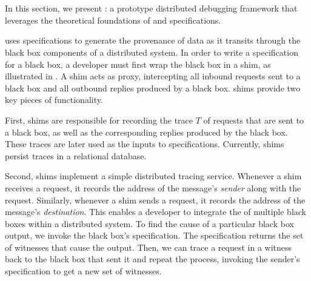\section{\fluent{}}
In this section, we present \fluent{}: a prototype distributed debugging
framework that leverages the theoretical foundations of \watprovenance{} and
\watprovenance{} specifications.
%

{}

\fluent{} uses \watprovenance{} specifications to generate the provenance of
data as it transits through the black box components of a distributed system.
In order to write a \watprovenance{} specification for a black box, a developer
must first wrap the black box in a \fluent{} shim, as illustrated in
. A shim acts as proxy, intercepting all inbound requests
sent to a black box and all outbound replies produced by a black box. \fluent{}
shims provide two key pieces of functionality.

First, \fluent{} shims are responsible for recording the trace $T$ of requests
that are sent to a black box, as well as the corresponding replies produced by
the black box. These traces are later used as the inputs to \watprovenance{}
specifications.  Currently, \fluent{} shims persist traces in a relational
database.

Second, \fluent{} shims implement a simple distributed tracing service.
Whenever a \fluent{} shim receives a request, it records the address of the
message's \emph{sender} along with the request. Similarly, whenever a \fluent{}
shim sends a request, it records the address of the message's
\emph{destination}.
%
This enables a developer to integrate the \watprovenance{} of multiple black
boxes within a distributed system. To find the cause of a particular black box
output, we invoke the black box's \watprovenance{} specification.  The
specification returns the set of witnesses that cause the output. Then, we can
trace a request in a witness back to the black box that sent it and repeat the
process, invoking the sender's \watprovenance{} specification to get a new set
of witnesses.


